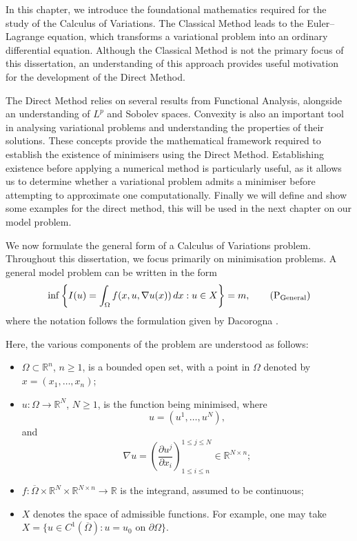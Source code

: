 In this chapter, we introduce the foundational mathematics required for the study of the Calculus of Variations. The Classical Method leads to the Euler–Lagrange equation, which transforms a variational problem into an ordinary differential equation. Although the Classical Method is not the primary focus of this dissertation, an understanding of this approach provides useful motivation for the development of the Direct Method.

The Direct Method relies on several results from Functional Analysis, alongside an understanding of $L^p$ and Sobolev spaces. Convexity is also an important tool in analysing variational problems and understanding the properties of their solutions. These concepts provide the mathematical framework required to establish the existence of minimisers using the Direct Method. Establishing existence before applying a numerical method is particularly useful, as it allows us to determine whether a variational problem admits a minimiser before attempting to approximate one computationally. Finally we will define and show some examples for the direct method, this will be used in the next chapter on our model problem.

We now formulate the general form of a Calculus of Variations problem. Throughout this dissertation, we focus primarily on minimisation problems. A general model problem can be written in the form
\begin{equation}
\inf \left\{ I(u) = \int_\Omega f(x,u,\nabla u(x)) \, dx : u \in X \right\} = m,
\tag{$\text{P}_\text{General}$}
\label{eq:General_P}
\end{equation}
where the notation follows the formulation given by Dacorogna \cite[p.~3]{dacorogna}.

Here, the various components of the problem are understood as follows:
\begin{itemize}
    \item $\Omega \subset \mathbb{R}^n$, $n \geq 1$, is a bounded open set, with a point in $\Omega$ denoted by $x = (x_1,\dots,x_n)$;

    \item $u : \Omega \rightarrow \mathbb{R}^N$, $N \geq 1$, is the function being minimised, where
    \[
        u = (u^1,\dots,u^N),
    \]
    and
    \[
        \nabla u =
        \left(
        \frac{\partial u^j}{\partial x_i}
        \right)^{1\leq j\leq N}_{1\leq i\leq n}
        \in \mathbb{R}^{N\times n};
    \]

    \item $f : \overline{\Omega} \times \mathbb{R}^N
    \times \mathbb{R}^{N\times n} \rightarrow \mathbb{R}$ is the integrand, assumed to be continuous;

    \item $X$ denotes the space of admissible functions. For example, one may take
    $X = \{u \in C^1(\overline{\Omega}) : u = u_0 \text{ on } \partial\Omega\}$.
\end{itemize}

